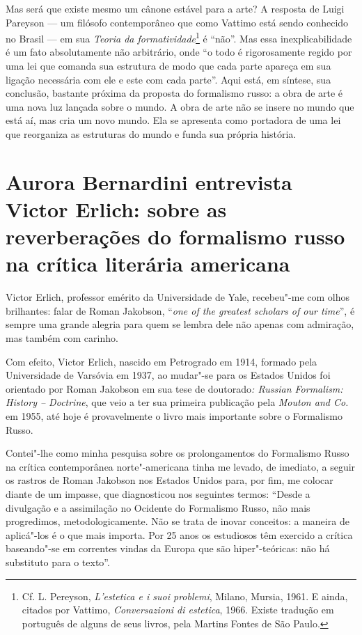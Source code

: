Mas será que existe mesmo um cânone estável para a arte? A resposta de
Luigi Pareyson --- um filósofo contemporâneo que como Vattimo está sendo
conhecido no Brasil --- em sua \emph{Teoria da formatividade}\footnote{Cf.
  L. Pereyson, \emph{L'estetica e i suoi problemi}, Milano, Mursia,
  1961. E ainda, citados por Vattimo, \emph{Conversazioni di estetica},
  1966. Existe tradução em português de alguns de seus livros, pela
  Martins Fontes de São Paulo.} é ``não''. Mas essa inexplicabilidade é
um fato absolutamente não arbitrário, onde ``o todo é rigorosamente
regido por uma lei que comanda sua estrutura de modo que cada parte
apareça em sua ligação necessária com ele e este com cada parte''. Aqui
está, em síntese, sua conclusão, bastante próxima da proposta do
formalismo russo: a obra de arte é uma nova luz lançada sobre o mundo. A
obra de arte não se insere no mundo que está aí, mas cria um novo mundo.
Ela se apresenta como portadora de uma lei que reorganiza as estruturas
do mundo e funda sua própria história.

\chapter*{Aurora Bernardini entrevista Victor Erlich: sobre as reverberações do formalismo russo na crítica literária americana}


Victor Erlich, professor emérito da Universidade de Yale, recebeu"-me com
olhos brilhantes: falar de Roman Jakobson, ``\emph{one of the greatest
scholars of our time}'', é sempre uma grande alegria para quem se lembra
dele não apenas com admiração, mas também com carinho.

Com efeito, Victor Erlich, nascido em Petrogrado em 1914, formado pela
Universidade de Varsóvia em 1937, ao mudar"-se para os Estados Unidos foi
orientado por Roman Jakobson em sua tese de doutorado\emph{: Russian
Formalism: History -- Doctrine}, que veio a ter sua primeira publicação
pela \emph{Mouton and Co.} em 1955, até hoje é provavelmente o livro
mais importante sobre o Formalismo Russo.

Contei"-lhe como minha pesquisa sobre os prolongamentos do Formalismo
Russo na crítica contemporânea norte"-americana tinha me levado, de
imediato, a seguir os rastros de Roman Jakobson nos Estados Unidos para,
por fim, me colocar diante de um impasse, que diagnosticou nos seguintes
termos: ``Desde a divulgação e a assimilação no Ocidente do Formalismo
Russo, não mais progredimos, metodologicamente. Não se trata de inovar
conceitos: a maneira de aplicá"-los é o que mais importa. Por 25 anos os
estudiosos têm exercido a crítica baseando"-se em correntes vindas da
Europa que são hiper"-teóricas: não há substituto para o texto''.

